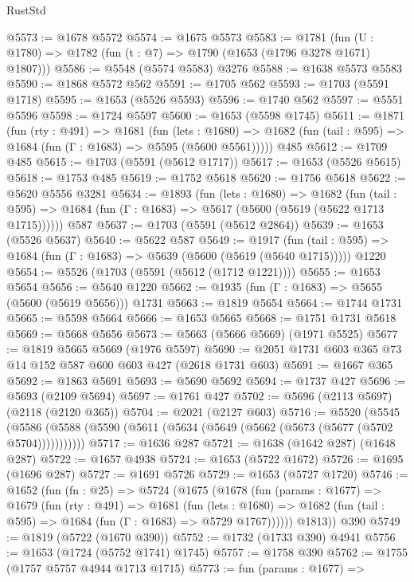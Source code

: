 \begin{lexlean}{RustStd}
\begin{coremodule}
@5573 := @1678 @5572
@5574 := @1675 @5573
@5583 := @1781 (fun (U : @1780) => @1782 (fun (t : @7) => @1790 (@1653 (@1796 @3278 @1671) @1807)))
@5586 := @5548 (@5574 @5583) @3276
@5588 := @1638 @5573 @5583
@5590 := @1868 @5572 @562
@5591 := @1705 @562
@5593 := @1703 (@5591 @1718)
@5595 := @1653 (@5526 @5593)
@5596 := @1740 @562
@5597 := @5551 @5596
@5598 := @1724 @5597
@5600 := @1653 (@5598 @1745)
@5611 := @1871
    (fun (rty : @491) =>
    @1681
      (fun (lets : @1680) =>
      @1682 (fun (tail : @595) => @1684 (fun (Γ : @1683) => @5595 (@5600 @5561)))))
    @485
@5612 := @1709 @485
@5615 := @1703 (@5591 (@5612 @1717))
@5617 := @1653 (@5526 @5615)
@5618 := @1753 @485
@5619 := @1752 @5618
@5620 := @1756 @5618
@5622 := @5620 @5556 @3281
@5634 := @1893
    (fun (lets : @1680) =>
    @1682
      (fun (tail : @595) => @1684 (fun (Γ : @1683) => @5617 (@5600 (@5619 (@5622 @1713 @1715))))))
    @587
@5637 := @1703 (@5591 (@5612 @2864))
@5639 := @1653 (@5526 @5637)
@5640 := @5622 @587
@5649 := @1917
    (fun (tail : @595) => @1684 (fun (Γ : @1683) => @5639 (@5600 (@5619 (@5640 @1715)))))
    @1220
@5654 := @5526 (@1703 (@5591 (@5612 (@1712 @1221))))
@5655 := @1653 @5654
@5656 := @5640 @1220
@5662 := @1935 (fun (Γ : @1683) => @5655 (@5600 (@5619 @5656))) @1731
@5663 := @1819 @5654
@5664 := @1744 @1731
@5665 := @5598 @5664
@5666 := @1653 @5665
@5668 := @1751 @1731 @5618
@5669 := @5668 @5656
@5673 := @5663 (@5666 @5669) (@1971 @5525)
@5677 := @1819 @5665 @5669 (@1976 @5597)
@5690 := @2051 @1731 @603 @365 @73 @14 @152 @587 @600 @603 @427 (@2618 @1731 @603)
@5691 := @1667 @365
@5692 := @1863 @5691
@5693 := @5690 @5692
@5694 := @1737 @427
@5696 := @5693 (@2109 @5694)
@5697 := @1761 @427
@5702 := @5696 (@2113 @5697) (@2118 (@2120 @365))
@5704 := @2021 (@2127 @603)
@5716 := @5520
    (@5545 (@5586 (@5588 (@5590 (@5611 (@5634 (@5649 (@5662 (@5673 (@5677 (@5702 @5704)))))))))))
@5717 := @1636 @287
@5721 := @1638 (@1642 @287) (@1648 @287)
@5722 := @1657 @4938
@5724 := @1653 (@5722 @1672)
@5726 := @1695 (@1696 @287)
@5727 := @1691 @5726
@5729 := @1653 (@5727 @1720)
@5746 := @1652
    (fun (fn : @25) =>
    @5724
      (@1675
        (@1678
          (fun (params : @1677) =>
          @1679
            (fun (rty : @491) =>
            @1681
              (fun (lets : @1680) =>
              @1682 (fun (tail : @595) => @1684 (fun (Γ : @1683) => @5729 @1767))))))
        @1813))
    @390
@5749 := @1819 (@5722 (@1670 @390))
@5752 := @1732 (@1733 @390) @4941
@5756 := @1653 (@1724 (@5752 @1741) @1745)
@5757 := @1758 @390
@5762 := @1755 (@1757 @5757 @4944 @1713 @1715)
@5773 := fun (params : @1677) =>

\end{coremodule}
\end{lexlean}
